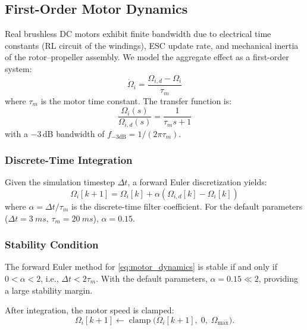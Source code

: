 \documentclass[journal]{IEEEtran}
\newcommand{\clamp}{\operatorname{clamp}}
\begin{document}
\subsection{First-Order Motor Dynamics}

Real brushless DC motors exhibit finite bandwidth due to electrical time constants (RL circuit of the windings), ESC update rate, and mechanical inertia of the rotor--propeller assembly. We model the aggregate effect as a first-order system:
\begin{equation}
  \dot{\Omega}_i = \frac{\Omega_{i,d} - \Omega_i}{\tau_m}
  \label{eq:motor_dynamics}
\end{equation}
where $\tau_m$ is the motor time constant. The transfer function is:
\begin{equation}
  \frac{\Omega_i(s)}{\Omega_{i,d}(s)} = \frac{1}{\tau_m s + 1}
  \label{eq:motor_tf}
\end{equation}
with a $-3$\,dB bandwidth of $f_{-3\text{dB}} = 1/(2\pi\tau_m)$.

\subsubsection{Discrete-Time Integration}

Given the simulation timestep $\Delta t$, a forward Euler discretization yields:
\begin{equation}
  \Omega_i[k\!+\!1] = \Omega_i[k] + \alpha \left(\Omega_{i,d}[k] - \Omega_i[k]\right)
  \label{eq:euler_motor}
\end{equation}
where $\alpha = \Delta t / \tau_m$ is the discrete-time filter coefficient. For the default parameters ($\Delta t = \SI{3}{ms}$, $\tau_m = \SI{20}{ms}$), $\alpha = 0.15$.

\subsubsection{Stability Condition}

The forward Euler method for \eqref{eq:motor_dynamics} is stable if and only if $0 < \alpha < 2$, i.e., $\Delta t < 2\tau_m$. With the default parameters, $\alpha = 0.15 \ll 2$, providing a large stability margin.

After integration, the motor speed is clamped:
\begin{equation}
  \Omega_i[k\!+\!1] \leftarrow \clamp\bigl(\Omega_i[k\!+\!1], \; 0, \; \Omega_{\max}\bigr).
  \label{eq:clamp_omega}
\end{equation}
\end{document}
